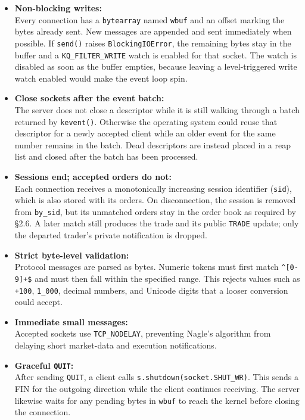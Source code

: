 \documentclass[
]{article}
\providecommand{\tightlist}{%
  \setlength{\itemsep}{0pt}\setlength{\parskip}{0pt}}
\begin{document}
\begin{itemize}
\tightlist
\item
  \textbf{Non-blocking writes:}\\
  Every connection has a \texttt{bytearray} named \texttt{wbuf} and an
  offset marking the bytes already sent. New messages are appended and sent
  immediately when possible. If \texttt{send()} raises
  \texttt{BlockingIOError}, the remaining bytes stay in the buffer and a
  \texttt{KQ\_FILTER\_WRITE} watch is enabled for that socket. The watch is
  disabled as soon as the buffer empties, because leaving a level-triggered
  write watch enabled would make the event loop spin.
\item
  \textbf{Close sockets after the event batch:}\\
  The server does not close a descriptor while it is still walking through
  a batch returned by \texttt{kevent()}. Otherwise the operating system could
  reuse that descriptor for a newly accepted client while an older event for
  the same number remains in the batch. Dead descriptors are instead placed
  in a reap list and closed after the batch has been processed.
\item
  \textbf{Sessions end; accepted orders do not:}\\
  Each connection receives a monotonically increasing session identifier
  (\texttt{sid}), which is also stored with its orders. On disconnection,
  the session is removed from \texttt{by\_sid}, but its unmatched orders stay
  in the order book as required by §2.6. A later match still produces the
  trade and its public \texttt{TRADE} update; only the departed trader's
  private notification is dropped.
\item
  \textbf{Strict byte-level validation:}\\
  Protocol messages are parsed as bytes. Numeric tokens must first match
  \texttt{\^{}{[}0-9{]}+\$} and must then fall within the specified range.
  This rejects values such as \texttt{+100}, \texttt{1\_000}, decimal
  numbers, and Unicode digits that a looser conversion could accept.
\item
  \textbf{Immediate small messages:}\\
  Accepted sockets use \texttt{TCP\_NODELAY}, preventing Nagle's algorithm
  from delaying short market-data and execution notifications.
\item
  \textbf{Graceful \texttt{QUIT}:}\\
  After sending \texttt{QUIT}, a client calls
  \texttt{s.shutdown(socket.SHUT\_WR)}. This sends a FIN for the outgoing
  direction while the client continues receiving. The server likewise waits
  for any pending bytes in \texttt{wbuf} to reach the kernel before closing
  the connection.
\end{itemize}
\end{document}
